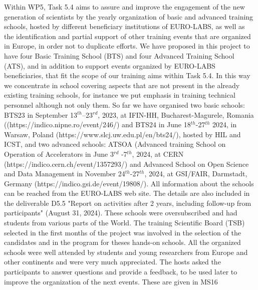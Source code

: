 Within WP5, Task 5.4 aims to assure and improve the engagement of the new generation of scientists by the yearly organization of basic and advanced training schools, hosted by different beneficiary institutions of EURO-LABS, as well as the identification and partial support of other training events that are organized in Europe, in order not to duplicate efforts. We have proposed  in this project to have four Basic Training School (BTS) and four Advanced Training School (ATS), and in addition to support events organized by EURO-LABS beneficiaries, that fit the scope of our training aims within Task 5.4. In this way we concentrate in school covering aspects that are not present in the already existing training schools, for instance we put emphasis in training technical personnel although not only them.
So far we have organised two basic schools: BTS23 in September 13$^{th}$–23$^{rd}$, 2023, at IFIN-HH, Bucharest-Magurele, Romania ((https://indico.nipne.ro/event/246/) and BTS24 in June 18$^{th}$-27$^{th}$ 2024, in Warsaw, Poland (https://www.slcj.uw.edu.pl/en/bts24/), hosted by HIL and ICST, and two advanced schools: ATSOA (Advanced training School on Operation of Accelerators in June 3$^{rd}$ -7$^{th}$, 2024, at CERN (https://indico.cern.ch/event/1357293/) and Advanced School on Open Science and Data Management in November 24$^{th}$-27$^{th}$, 2024, at GSI/FAIR, Darmstadt, Germany (https://indico.gsi.de/event/19808/). All information about the schools can be reached from the EURO-LABS web site. The details are also included in the deliverable D5.5 "Report on activities after 2 years, including follow-up from participants" (August 31, 2024). These schools were oversubscribed and had students from various parts of the World.  The training Scientific Board (TSB) selected in the first months of the project was involved in the selection of the candidates and in the program for theses hands-on schools. All the organized schools were well attended by students and young researchers from Europe and other continents and were very much appreciated. The hosts asked the participants to answer questions and provide a feedback,  
to be used later to improve the organization of the next events. These are given in MS16

